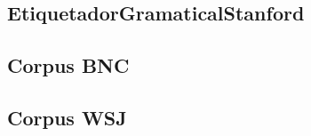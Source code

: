 




 
 
 	







\subsection{EtiquetadorGramaticalStanford}

\subsection{Corpus BNC} 
\subsection{Corpus WSJ} 






